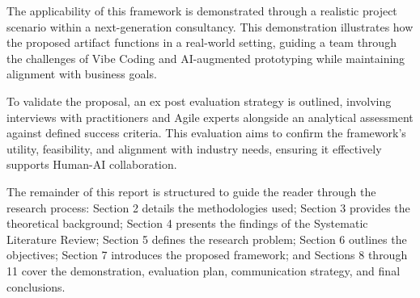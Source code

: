 The applicability of this framework is demonstrated through a realistic project scenario within a next-generation consultancy. This demonstration illustrates how the proposed artifact functions in a real-world setting, guiding a team through the challenges of Vibe Coding and AI-augmented prototyping while maintaining alignment with business goals.

To validate the proposal, an ex post evaluation strategy is outlined, involving interviews with practitioners and Agile experts alongside an analytical assessment against defined success criteria. This evaluation aims to confirm the framework's utility, feasibility, and alignment with industry needs, ensuring it effectively supports Human-AI collaboration.

The remainder of this report is structured to guide the reader through the research process: Section 2 details the methodologies used; Section 3 provides the theoretical background; Section 4 presents the findings of the Systematic Literature Review; Section 5 defines the research problem; Section 6 outlines the objectives; Section 7 introduces the proposed framework; and Sections 8 through 11 cover the demonstration, evaluation plan, communication strategy, and final conclusions.



